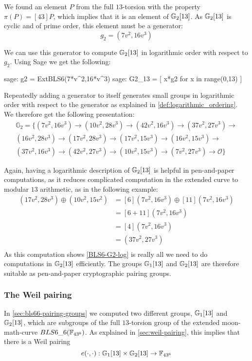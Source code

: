 We found an element $P$ from the full $13$-torsion with the property $\pi(P) = [43]P$, which implies that it is an element of $\mathbb{G}_2[13]$. As $\mathbb{G}_2[13]$ is cyclic and of prime order, this element must be a generator:
\begin{equation}
g_{2} = (7v^2, 16v^3)
\end{equation}

We can use this generator to compute $\mathbb{G}_2[13]$ in logarithmic order with respect to $g_{2}$. Using Sage we get the following:
\begin{sagecommandline}
sage: g2 = ExtBLS6(7*v^2,16*v^3)
sage: G2_13 = [ x*g2 for x in range(0,13) ]
\end{sagecommandline}
Repeatedly adding a generator to itself generates small groups in logarithmic order with respect to the generator as explained in \ref{def:logarithmic_ordering}. We therefore get the following presentation:
\begin{multline}
\label{BLS6-G2-log}
\mathbb{G}_2=\{
(7v^2, 16v^3) \to
(10v^2, 28v^3)\to
(42v^2, 16v^3)\to
(37v^2, 27v^3)\to\\
(16v^2, 28v^3)\to
(17v^2, 28v^3)\to
(17v^2, 15v^3)\to
(16v^2, 15v^3)\to\\
(37v^2, 16v^3)\to
(42v^2, 27v^3)\to
(10v^2, 15v^3)\to
(7v^2, 27v^3)\to
\mathcal{O}\}
\end{multline}

Again, having a logarithmic description of $\mathbb{G}_2[13]$ is helpful in pen-and-paper computations, as it reduces complicated computation in the extended curve to modular $13$ arithmetic, as in the following example:
\begin{align*}
(17v^2,28v^3)\oplus (10v^2,15v^2)  & = [6](7v^2,16v^3)\oplus [11](7v^2,16v^3)\\
                      & = [6+11](7v^2,16v^3)\\
                      & = [4](7v^2,16v^3)\\
                      & = (37v^2,27v^3)\\
\end{align*}
As this computation shows \ref{BLS6-G2-log} is really all we need to do computations in $\mathbb{G}_2[13]$ efficiently. The groups $\mathbb{G}_1[13]$ and $\mathbb{G}_2[13]$ are therefore suitable as pen-and-paper cryptographic pairing groups. 

\subsubsection{The Weil pairing}
In \ref{sec:bls66-pairing-groups} we computed two different groups, $\mathbb{G}_1[13]$ and $\mathbb{G}_2[13]$, which are subgroups of the full $13$-torsion group of the extended moon-math-curve $BLS6\_6(\mathbb{F}_{43^6})$. As explained in \ref{sec:weil-pairing}, this implies that there is a Weil pairing 
\begin{equation}
\label{BLS6-weil-pairing}
e(\cdot,\cdot): \mathbb{G}_1[13]\times\mathbb{G}_2[13] \to \mathbb{F}_{43^6}
\end{equation}

